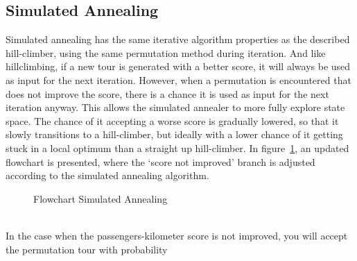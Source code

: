 \documentclass[journal]{IEEEtran}
\begin{document}
\subsection{Simulated Annealing}
Simulated annealing has the same iterative algorithm properties as the described hill-climber, using the same permutation method during iteration. And like hillclimbing, if a new tour is generated with a better score, it will always be used as input for the next iteration. However, when a permutation is encountered that does not improve the score, there is a chance it is used as input for the next iteration anyway. This allows the simulated annealer to more fully explore state space. The chance of it accepting a worse score is gradually lowered, so that it slowly transitions to a hill-climber, but ideally with a lower chance of it getting stuck in a local optimum than a straight up hill-climber. In figure~\ref{fig:flowchart_sa}, an updated flowchart is presented, where the `score not improved' branch is adjusted according to the simulated annealing algorithm.\\
\begin{figure}[!h]
\centering

\caption{Flowchart Simulated Annealing}
\label{fig:flowchart_sa}
\end{figure}
\\
In the case when the passengers-kilometer score is not improved, you will accept the permutation tour with probability 
\end{document}
